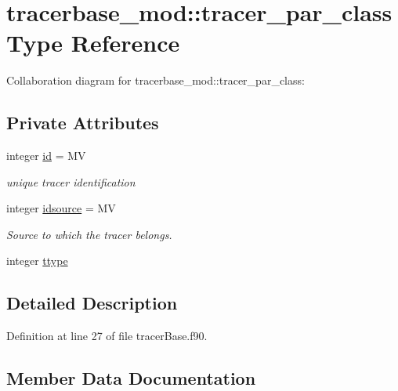 \hypertarget{structtracerbase__mod_1_1tracer__par__class}{}\section{tracerbase\+\_\+mod\+:\+:tracer\+\_\+par\+\_\+class Type Reference}
\label{structtracerbase__mod_1_1tracer__par__class}


Collaboration diagram for tracerbase\+\_\+mod\+:\+:tracer\+\_\+par\+\_\+class\+:
\subsection*{Private Attributes}
\begin{DoxyCompactItemize}
\item 
integer \mbox{\hyperlink{structtracerbase__mod_1_1tracer__par__class_adcbab7942d36e2c6d3cb41fc44c64347}{id}} = MV
\begin{DoxyCompactList}\small\item\em unique tracer identification \end{DoxyCompactList}\item 
integer \mbox{\hyperlink{structtracerbase__mod_1_1tracer__par__class_a3f68dcc16fb53779c2fd28cfa2b8393d}{idsource}} = MV
\begin{DoxyCompactList}\small\item\em Source to which the tracer belongs. \end{DoxyCompactList}\item 
integer \mbox{\hyperlink{structtracerbase__mod_1_1tracer__par__class_a4a5c162c0630aeda90c18e0641894dcc}{ttype}}
\end{DoxyCompactItemize}


\subsection{Detailed Description}


Definition at line 27 of file tracer\+Base.\+f90.



\subsection{Member Data Documentation}
\mbox{\label{structtracerbase__mod_1_1tracer__par__class_adcbab7942d36e2c6d3cb41fc44c64347}} 
